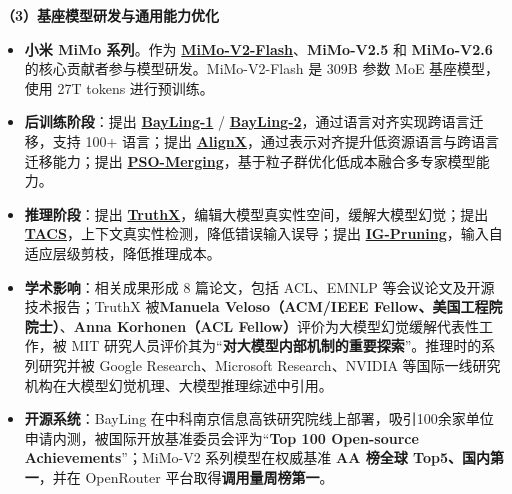 \documentclass{resume}
\begin{document}
\textbf{\large \textcolor{red1}{（3）基座模型研发与通用能力优化}}
\begin{itemize}[parsep=0.3ex]
\item \textbf{小米 MiMo 系列}。作为 \textbf{\href{https://arxiv.org/pdf/2601.02780}{MiMo-V2-Flash}}、\textbf{MiMo-V2.5} 和 \textbf{MiMo-V2.6} 的核心贡献者参与模型研发。MiMo-V2-Flash 是 309B 参数 MoE 基座模型，使用 27T tokens 进行预训练。

\item \textbf{后训练阶段}：提出 \textbf{\href{https://arxiv.org/abs/2306.10968}{BayLing-1}} / \textbf{\href{https://arxiv.org/abs/2411.16300}{BayLing-2}}，通过语言对齐实现跨语言迁移，支持 100+ 语言；提出 \textbf{\href{https://aclanthology.org/2025.emnlp-main.328/}{AlignX}}，通过表示对齐提升低资源语言与跨语言迁移能力；提出 \textbf{\href{https://arxiv.org/abs/2508.19839}{PSO-Merging}}，基于粒子群优化低成本融合多专家模型能力。

\item \textbf{推理阶段}：提出 \textbf{\href{https://arxiv.org/abs/2402.17811}{TruthX}}，编辑大模型真实性空间，缓解大模型幻觉；提出 \textbf{\href{https://aclanthology.org/2024.findings-acl.645/}{TACS}}，上下文真实性检测，降低错误输入误导；提出 \textbf{\href{https://aclanthology.org/2025.emnlp-main.537/}{IG-Pruning}}，输入自适应层级剪枝，降低推理成本。

\item \textbf{\textcolor{red2}{学术影响}}：相关成果形成 8 篇论文，包括 ACL、EMNLP 等会议论文及开源技术报告；TruthX 被\textbf{Manuela Veloso（ACM/IEEE Fellow、美国工程院院士）}、\textbf{Anna Korhonen（ACL Fellow）}评价为大模型幻觉缓解代表性工作，被 MIT 研究人员评价其为“\textbf{对大模型内部机制的重要探索}”。推理时的系列研究并被 Google Research、Microsoft Research、NVIDIA 等国际一线研究机构在大模型幻觉机理、大模型推理综述中引用。
\item \textbf{\textcolor{red2}{开源系统}}：BayLing 在中科南京信息高铁研究院线上部署，吸引100余家单位申请内测，被国际开放基准委员会评为“\textbf{Top 100 Open-source Achievements}”；MiMo-V2 系列模型在权威基准\textbf{ AA 榜全球 Top5、国内第一}，并在 OpenRouter 平台取得\textbf{调用量周榜第一}。

\end{itemize}




\end{document}
